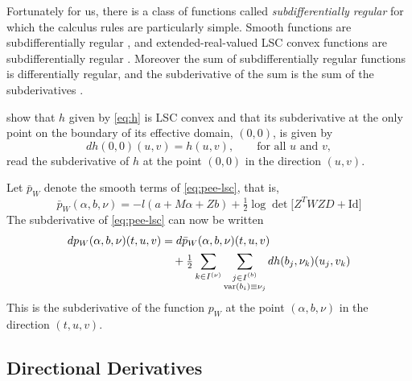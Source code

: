 Fortunately for us, there is a class of functions called
\emph{subdifferentially regular} \citep[Definition~7.25]{rockafellar-wets}
for which the calculus rules are particularly simple.
Smooth functions are subdifferentially regular
\citep[Exercise~8.20]{rockafellar-wets}, and
extended-real-valued LSC convex functions are subdifferentially regular
\citep[Proposition~8.21]{rockafellar-wets}.
Moreover the sum of subdifferentially regular functions is differentially
regular, and the subderivative of the sum is the sum of the subderivatives
\citep[Corollary~10.9]{rockafellar-wets}.

\citet[Section~1.10.2]{reaster-tr} show that $h$ given by \eqref{eq:h}
is LSC convex and that its subderivative at the only point on the boundary
of its effective domain, $(0, 0)$, is given by
\begin{equation} \label{eq:d-h}
   d h(0, 0)(u, v) = h(u, v), \qquad \text{for all $u$ and $v$},
\end{equation}
read the subderivative of $h$ at the point $(0, 0)$ in the direction
$(u, v)$.

Let $\bar{p}_W$ denote the smooth terms of \eqref{eq:pee-lsc}, that is,
\begin{equation} \label{eq:pee-bar}
   \bar{p}_W(\alpha, b, \nu)
   =
   - l(a + M \alpha + Z b)
   + \tfrac{1}{2} \log \det \bigl[ Z^T W Z D + \text{Id} \bigr]
\end{equation}
The subderivative of \eqref{eq:pee-lsc} can now be written
\begin{equation} \label{eq:pee-lsc-subderivative}
\begin{split}
   d p_W(\alpha, b, \nu)(t, u, v)
   & =
   d \bar{p}_W(\alpha, b, \nu)(t, u, v)
   \\
   & \quad
   + \tfrac{1}{2}
   \sum_{k \in I^{(\nu)}}
   \sum_{\substack{j \in I^{(b)} \\ \operatorname{var}(b_i) \equiv \nu_j}}
   d h(b_j, \nu_k)(u_j, v_k)
\end{split}
\end{equation}
This is the subderivative of the function $p_W$ at the point $(\alpha, b, \nu)$
in the direction $(t, u, v)$.

\subsection{Directional Derivatives}
\label{sec:directional-derivatives}

